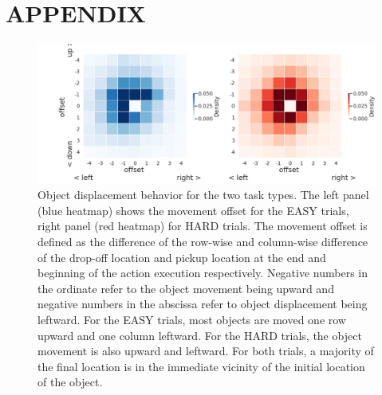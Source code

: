 \section{APPENDIX}


\begin{figure}[h]
    \centering
    \includegraphics[scale=0.25]{source/figures/results/shelf_grasp_offsets.png}
    \caption[]{Object displacement behavior for the two task types. The left panel (blue heatmap) shows the movement offset for the EASY trials, right panel (red heatmap) for HARD trials. The movement offset is defined as the difference of the row-wise and column-wise difference of the drop-off location and pickup location at the end and beginning of the action execution respectively. Negative numbers in the ordinate refer to the object movement being upward and negative numbers in the abscissa refer to object displacement being leftward. For the EASY trials, most objects are moved one row upward and one column leftward. For the HARD trials, the object movement is also upward and leftward. For both trials, a majority of the final location is in the immediate vicinity of the initial location of the object.}
    \label{figure:offset}
\end{figure}


